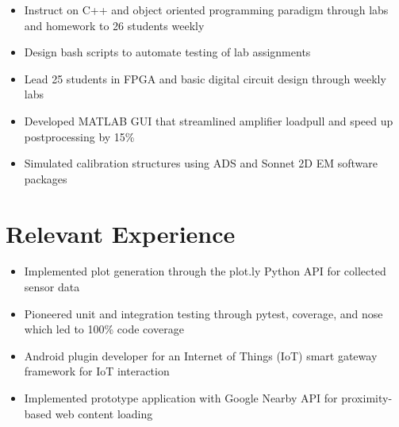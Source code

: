 \documentclass{resume}
\begin{document}
\begin{itemize}[noitemsep,nolistsep]
  \item Instruct on C++ and object oriented programming paradigm through labs and homework to 26 students weekly
  \item Design bash scripts to automate testing of lab assignments
  \item Lead 25 students in FPGA and basic digital circuit design through weekly labs
\end{itemize}

\begin{itemize}[noitemsep,nolistsep]
  \item Developed MATLAB GUI that streamlined amplifier loadpull and speed up postprocessing by 15\%
  \item Simulated calibration structures using ADS and Sonnet 2D EM software packages
\end{itemize}

\section{%
Relevant Experience}

\begin{itemize}[noitemsep, nolistsep]
  \item Implemented plot generation through the plot.ly Python API for collected sensor data
  \item Pioneered unit and integration testing through pytest, coverage, and nose which led to 100\% code coverage
\end{itemize}

\begin{itemize}[noitemsep, nolistsep]
  \item Android plugin developer for an Internet of Things (IoT) smart gateway framework for IoT interaction
  \item Implemented prototype application with Google Nearby API for proximity-based web content loading
\end{itemize}
\end{document}
